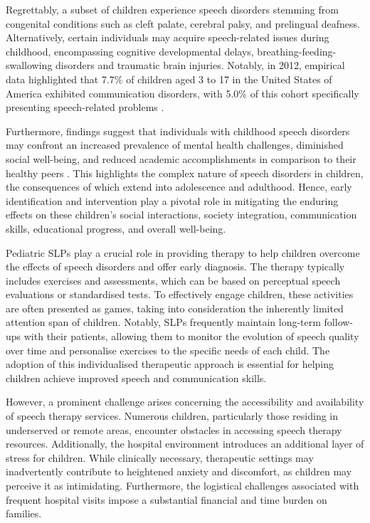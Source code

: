 Regrettably, a subset of children experience speech disorders stemming from congenital conditions such as cleft palate, cerebral palsy, and prelingual deafness. Alternatively, certain individuals may acquire speech-related issues during childhood, encompassing cognitive developmental delays, breathing-feeding-swallowing disorders and traumatic brain injuries. Notably, in 2012, empirical data highlighted that 7.7\% of children aged 3 to 17 in the United States of America exhibited communication disorders, with 5.0\% of this cohort specifically presenting speech-related problems \cite{black2015communication} .

Furthermore, findings suggest that individuals with childhood speech disorders may confront an increased prevalence of mental health challenges, diminished social well-being, and reduced academic accomplishments in comparison to their healthy peers \cite{langbecker2020long}. This highlights the complex nature of speech disorders in children, the consequences of which extend into adolescence and adulthood. Hence, early identification and intervention play a pivotal role in mitigating the enduring effects on these children's social interactions, society integration, communication skills, educational progress, and overall well-being.

Pediatric \acp{SLP} play a crucial role in providing therapy to help children overcome the effects of speech disorders and offer early diagnosis. The therapy typically includes exercises and assessments, which can be based on perceptual speech evaluations or standardised tests. To effectively engage children, these activities are often presented as games, taking into consideration the inherently limited attention span of children. Notably, \acp{SLP} frequently maintain long-term follow-ups with their patients, allowing them to monitor the evolution of speech quality over time and personalise exercises to the specific needs of each child. The adoption of this individualised therapeutic approach is essential for helping children achieve improved speech and communication skills.

However, a prominent challenge arises concerning the accessibility and availability of speech therapy services. Numerous children, particularly those residing in underserved or remote areas, encounter obstacles in accessing speech therapy resources. Additionally, the hospital environment introduces an additional layer of stress for children. While clinically necessary, therapeutic settings may inadvertently contribute to heightened anxiety and discomfort, as children may perceive it as intimidating. Furthermore, the logistical challenges associated with frequent hospital visits impose a substantial financial and time burden on families.


